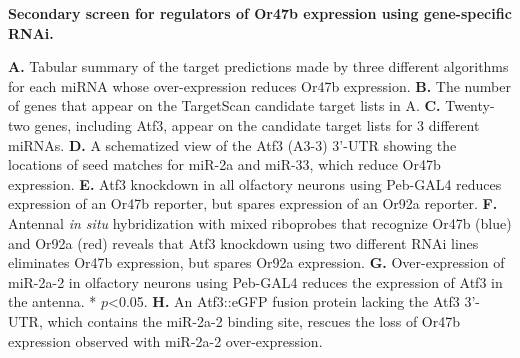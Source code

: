 {\bf Secondary screen for regulators of Or47b expression using gene-specific RNAi.}

\textbf{A.} Tabular summary of the target predictions made by three different algorithms for each miRNA whose over-expression reduces Or47b expression.
\textbf{B.} The number of genes that appear on the TargetScan candidate target lists in A.
\textbf{C.} Twenty-two genes, including Atf3, appear on the candidate target lists for 3 different miRNAs.
\textbf{D.} A schematized view of the Atf3 (A3-3) 3'-UTR showing the locations of seed matches for miR-2a and miR-33, which reduce Or47b expression.
\textbf{E.} Atf3 knockdown in all olfactory neurons using Peb-GAL4 reduces expression of an Or47b reporter, but spares expression of an Or92a reporter.
\textbf{F.} Antennal \emph{in situ} hybridization with mixed riboprobes that recognize Or47b (blue) and Or92a (red) reveals that Atf3 knockdown using two different RNAi lines eliminates Or47b expression, but spares Or92a expression.
\textbf{G.} Over-expression of miR-2a-2 in olfactory neurons using Peb-GAL4 reduces the expression of Atf3 in the antenna. * $p$<0.05.
\textbf{H.} An Atf3::eGFP fusion protein lacking the Atf3 3'-UTR, which contains the miR-2a-2 binding site, rescues the loss of Or47b expression observed with miR-2a-2 over-expression.
\label{fig:2}